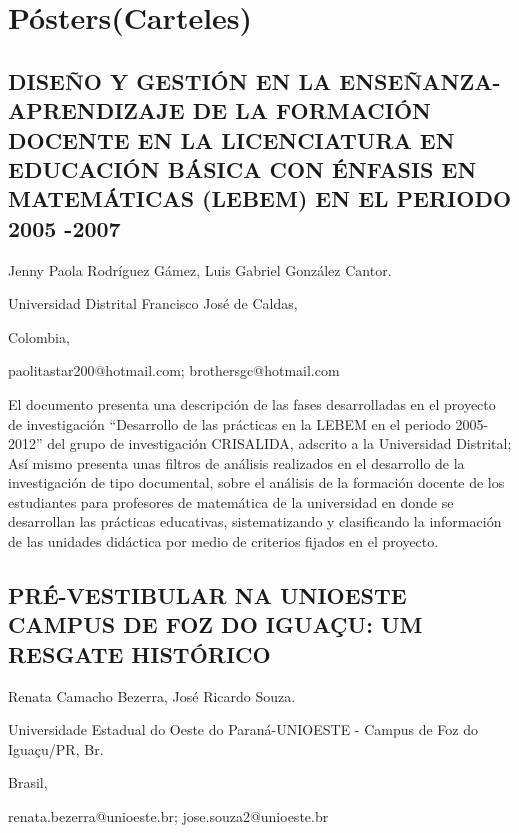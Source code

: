 
\pagestyle{headings}
\nocite{*}
\fontsize{7}{8}\selectfont
\pagecolor{white} 

\onecolumn
\chapter{Pósters(Carteles) } 
\renewcommand\thesection{PO\ \nplpadding{3}\numprint{\arabic{section}}} 
\setcounter{section}{0}
\chaptertoc
\twocolumn
\balance





\section{DISEÑO Y GESTIÓN EN LA ENSEÑANZA-APRENDIZAJE DE LA FORMACIÓN DOCENTE
EN LA LICENCIATURA EN EDUCACIÓN BÁSICA CON ÉNFASIS EN MATEMÁTICAS
(LEBEM) EN EL PERIODO 2005 -2007}

\begin{datos}

Jenny Paola Rodríguez Gámez, Luis Gabriel González Cantor.

Universidad Distrital Francisco José de Caldas,

Colombia,

paolitastar200@hotmail.com; brothersgc@hotmail.com

\end{datos}

El documento presenta una descripción de las fases desarrolladas en
el proyecto de investigación “Desarrollo de las prácticas en la LEBEM
en el periodo 2005-2012” del grupo de investigación CRISALIDA, adscrito
a la Universidad Distrital; Así mismo presenta unas filtros de análisis
realizados en el desarrollo de la investigación de tipo documental,
sobre el análisis de la formación docente de los estudiantes para
profesores de matemática de la universidad en donde se desarrollan
las prácticas educativas, sistematizando y clasificando la información
de las unidades didáctica por medio de criterios fijados en el proyecto.


\section{PRÉ-VESTIBULAR NA UNIOESTE CAMPUS DE FOZ DO IGUAÇU: UM RESGATE HISTÓRICO }

\begin{datos}

Renata Camacho Bezerra, José Ricardo Souza.

Universidade Estadual do Oeste do Paraná-UNIOESTE - Campus de Foz
do Iguaçu/PR, Br. 

Brasil,

renata.bezerra@unioeste.br; jose.souza2@unioeste.br 

\end{datos}

